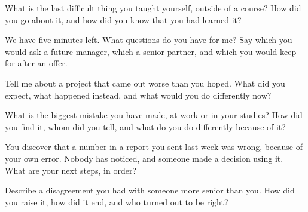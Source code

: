 \begin{question}\label{iq:iv2:behavioural-and-fit:13}
What is the last difficult thing you taught yourself, outside of a course? How did you go about it, and how did you know that you had learned it?
\end{question}

\begin{question}\label{iq:iv2:behavioural-and-fit:14}
We have five minutes left. What questions do you have for me? Say which you would ask a future manager, which a senior partner, and which you would keep for after an offer.
\end{question}

\begin{question}\label{iq:iv2:behavioural-and-fit:15}
Tell me about a project that came out worse than you hoped. What did you expect, what happened instead, and what would you do differently now?
\end{question}

\begin{question}\label{iq:iv2:behavioural-and-fit:16}
What is the biggest mistake you have made, at work or in your studies? How did you find it, whom did you tell, and what do you do differently because of it?
\end{question}

\begin{question}\label{iq:iv2:behavioural-and-fit:17}
You discover that a number in a report you sent last week was wrong, because of your own error. Nobody has noticed, and someone made a decision using it. What are your next steps, in order?
\end{question}

\begin{question}\label{iq:iv2:behavioural-and-fit:18}
Describe a disagreement you had with someone more senior than you. How did you raise it, how did it end, and who turned out to be right?
\end{question}

